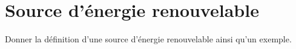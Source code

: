 \section{Source d'énergie renouvelable}\label{ex:renouvelable}

Donner la définition d'une source d'énergie renouvelable ainsi qu'un exemple.